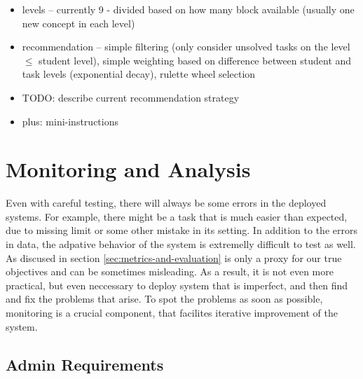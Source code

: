 \begin{itemize}
\item levels -- currently 9 - divided based on how many block available (usually one new concept in each level)
\item recommendation -- simple filtering (only consider unsolved tasks on the level $\leq$ student level), simple weighting based on difference between student and task levels (exponential decay), rulette wheel selection
\item TODO: describe current recommendation strategy
\item plus: mini-instructions
\end{itemize}





\section{Monitoring and Analysis}
\label{sec:robomission.monitoring}

Even with careful testing, there will always be some errors in the deployed systems.
For example, there might be a task that is much easier than expected,
due to missing limit or some other mistake in its setting.
In addition to the errors in data,  %
the adpative behavior of the system is extremelly difficult to test as well.
As discused in section \ref{sec:metrics-and-evaluation} is only a proxy for our true objectives
and can be sometimes misleading.
As a result, it is not even more practical, but even neccessary to deploy system
that is imperfect, and then find and fix the problems that arise.
To spot the problems as soon as possible,
monitoring is a crucial component,
that facilites iterative improvement of the system.

\subsection{Admin Requirements}
\label{sec:admin-requirements}

